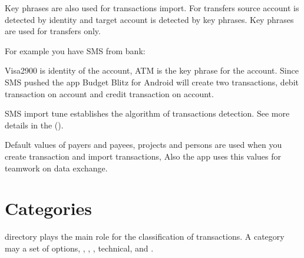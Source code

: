 \documentclass[a4paper,10pt,english]{sphinxmanual}
\begin{document}
Key phrases are also used for transactions import. For transfers source account is detected by identity
and target account is detected by key phrases. Key phrases are used for transfers only.

For example you have SMS from bank:

\begin{sphinxVerbatim}[commandchars=\\\{\}]
           
\end{sphinxVerbatim}

Visa2900 is identity of the  account, ATM is the key phrase for the  account.
Since SMS pushed the app Budget Blitz for Android will create two transactions, debit transaction on  account
and credit transaction on  account.

SMS import tune establishes the algorithm of transactions detection. See more details in the {\hyperref[\detokenize{notifications:chapter-notifications}]{}} ().

Default values of payers and payees, projects and persons are used when you create transaction
and import transactions, Also the app uses this values for teamwork on data exchange.

\noindent{}
\noindent{}
\noindent{}


\section{Categories}
\label{\detokenize{directories:categories}}
 directory plays the main role for the classification of transactions.
A category may a set of options,
, , ,
technical,  and  .
\end{document}
